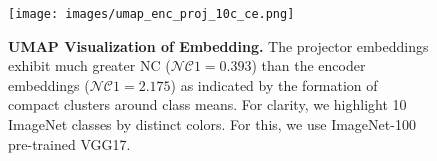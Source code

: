 \begin{figure}[t]
    \centering
    \texttt{[image: images/umap\_enc\_proj\_10c\_ce.png]}
  \caption{\textbf{UMAP Visualization of Embedding.} The projector embeddings exhibit much greater NC ($\mathcal{NC}1=0.393$) than the encoder embeddings ($\mathcal{NC}1=2.175$) as indicated by the formation of compact clusters around class means. For clarity, we highlight 10 ImageNet classes by distinct colors.
  For this, we use ImageNet-100 pre-trained VGG17.} 
  \label{fig:umap_vis}
\end{figure}